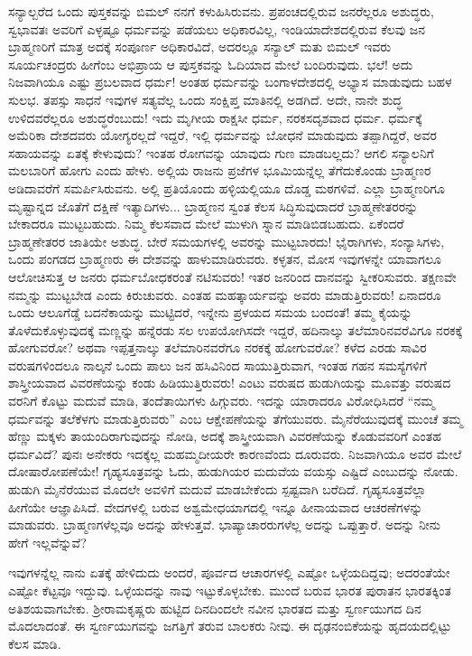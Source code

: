 ಸನ್ಯಾಲ್\enginline{-}ಬರೆದ ಒಂದು ಪುಸ್ತಕವನ್ನು ಬಿಮಲ್ ನನಗೆ ಕಳುಹಿಸಿರುವನು. ಪ್ರಪಂಚದಲ್ಲಿರುವ ಜನರೆಲ್ಲರೂ ಅಶುದ್ಧರು, ಸ್ವಭಾವತಃ ಅವರಿಗೆ ಎಳ್ಳಷ್ಟೂ ಧರ್ಮವನ್ನು ಪಡೆಯಲು ಅಧಿಕಾರವಿಲ್ಲ, ಇಂಡಿಯಾದೇಶದಲ್ಲಿರುವ ಕೆಲವು ಜನ ಬ್ರಾಹ್ಮಣರಿಗೆ ಮಾತ್ರ ಅದಕ್ಕೆ ಸಂಪೂರ್ಣ ಅಧಿಕಾರವಿದೆ, ಅದರಲ್ಲೂ ಸನ್ಯಾಲ್ ಮತು ಬಿಮಲ್ ಇವರು ಸೂರ್ಯಚಂದ್ರರು\enginline{-} ಹೀಗೆಂಬ ಅಭಿಪ್ರಾಯ ಆ ಪುಸ್ತಕವನ್ನು ಓದಿಯಾದ ಮೇಲೆ ಬಂದಿರುವುದು. ಭಲೆ! ಅದು ನಿಜವಾಗಿಯೂ ಎಷ್ಟು ಪ್ರಬಲವಾದ ಧರ್ಮ! ಅಂತಹ ಧರ್ಮವನ್ನು ಬಂಗಾಳದೇಶದಲ್ಲಿ ಅಭ್ಯಾಸ ಮಾಡುವುದು ಬಹಳ ಸುಲಭ. ತಪಸ್ಸು ಸಾಧನೆ ಇವುಗಳ ಸತ್ಯವೆಲ್ಲ ಒಂದು ಸಂಕ್ಷಿಪ್ತ ಮಾತಿನಲ್ಲಿ ಅಡಗಿದೆ. ಅದೇ, ನಾನೇ ಶುದ್ಧ ಉಳಿದವರೆಲ್ಲರೂ ಅಶುದ್ಧರೆಂಬುದು! ಇದು ಮೃಗೀಯ ರಾಕ್ಷಸೀ ಧರ್ಮ, ನರಕಸದೃಶವಾದ ಧರ್ಮ. ಧರ್ಮಕ್ಕೆ ಅಮೆರಿಕಾ ದೇಶದವರು ಯೋಗ್ಯರಲ್ಲದೆ ಇದ್ದರೆ, ಇಲ್ಲಿ ಧರ್ಮವನ್ನು ಬೋಧನೆ ಮಾಡುವುದು ತಪ್ಪಾಗಿದ್ದರೆ, ಅವರ ಸಹಾಯವನ್ನು ಏತಕ್ಕೆ ಕೇಳುವುದು? ಇಂತಹ ರೋಗವನ್ನು ಯಾವುದು ಗುಣ ಮಾಡಬಲ್ಲದು? ಆಗಲಿ ಸನ್ಯಾಲನಿಗೆ ಮಲಬಾರಿಗೆ ಹೋಗು ಎಂದು ಹೇಳು. ಅಲ್ಲಿಯ ರಾಜನು ಪ್ರಜೆಗಳ ಭೂಮಿಯನ್ನೆಲ್ಲ ತೆಗೆದುಕೊಂಡು ಬ್ರಾಹ್ಮಣರ ಅಡಿದಾವರೆಗೆ ಸಮರ್ಪಿಸಿರುವನು. ಅಲ್ಲಿ ಪ್ರತಿಯೊಂದು ಹಳ್ಳಿಯಲ್ಲಿಯೂ ದೊಡ್ಡ ಮಠಗಳಿವೆ. ಎಲ್ಲಾ ಬ್ರಾಹ್ಮಣರಿಗೂ ಮೃಷ್ಟಾನ್ನದ ಜೊತೆಗೆ ದಕ್ಷಿಣೆ ಇತ್ಯಾದಿಗಳು... ಬ್ರಾಹ್ಮಣನ ಸ್ವಂತ ಕೆಲಸ ಸಿದ್ಧಿಸುವುದಾದರೆ ಬ್ರಾಹ್ಮಣೇತರರನ್ನು ಬೇಕಾದರೂ ಮುಟ್ಟಬಹುದು. ನಿಮ್ಮ ಕೆಲಸವಾದ ಮೇಲೆ ಮುಳುಗಿ ಸ್ನಾನ ಮಾಡಿಬಿಡಬಹುದು. ಏಕೆಂದರೆ ಬ್ರಾಹ್ಮಣೇತರರ ಜಾತಿಯೇ ಅಶುದ್ಧ. ಬೇರೆ ಸಮಯಗಳಲ್ಲಿ ಅವರನ್ನು ಮುಟ್ಟಬಾರದು! ಭೈರಾಗಿಗಳು, ಸಂನ್ಯಾಸಿಗಳು, ಒಂದು ಪಂಗಡದ ಬ್ರಾಹ್ಮಣರು ಈ ದೇಶವನ್ನು ಹಾಳುಮಾಡಿರುವರು. ಕಳ್ಳತನ, ಮೋಸ ಇವುಗಳನ್ನೇ ಯಾವಾಗಲೂ ಆಲೋಚಿಸುತ್ತ ಆ ಜನರು ಧರ್ಮಬೋಧಕರಂತೆ ನಟಿಸುವರು! ಇತರ ಜನರಿಂದ ದಾನವನ್ನು ಸ್ವೀಕರಿಸುವರು. ತಕ್ಷಣವೇ ನಮ್ಮನ್ನು ಮುಟ್ಟಬೇಡ ಎಂದು ಕಿರುಚುವರು. ಎಂತಹ ಮಹತ್ಕಾರ್ಯವನ್ನು ಅವರು ಮಾಡುತ್ತಿರುವರು!\enginline{-} ಏನಾದರೂ ಒಂದು ಆಲೂಗೆಡ್ಡೆ ಬದನೆಕಾಯನ್ನು ಮುಟ್ಟಿದರೆ, ಇನ್ನೇನು ಪ್ರಳಯದ ಸಮಯ ಬಂದಂತೆ! ತಮ್ಮ ಕೈಯನ್ನು ತೊಳೆದುಕೊಳ್ಳುವುದಕ್ಕೆ ಮಣ್ಣನ್ನು ಹನ್ನೆರಡು ಸಲ ಉಪಯೋಗಿಸದೇ ಇದ್ದರೆ, ಹದಿನಾಲ್ಕು ತಲೆಮಾರಿನವರೆವಿಗೂ ನರಕಕ್ಕೆ ಹೋಗುವರೋ? ಅಥವಾ ಇಪ್ಪತ್ತನಾಲ್ಕು ತಲೆಮಾರಿನವರೆಗೂ ನರಕಕ್ಕೆ ಹೋಗುವರೋ? ಕಳೆದ ಎರಡು ಸಾವಿರ ವರುಷಗಳಿಂದಲೂ ನಾಲ್ಕನೆ ಒಂದು ಪಾಲು ಜನ ಹಸಿವಿನಿಂದ ಸಾಯುತ್ತಿರುವಾಗ, ಇಂತಹ ಗಹನ ಸಮಸ್ಯೆಗಳಿಗೆ ಶಾಸ್ತ್ರೀಯವಾದ ವಿವರಣೆಯನ್ನು ಕಂಡು ಹಿಡಿಯುತ್ತಿರುವರು! ಎಂಟು ವರುಷದ ಹುಡುಗಿಯನ್ನು ಮೂವತ್ತು ವರುಷದ ವರನಿಗೆ ಕೊಟ್ಟು ಮದುವೆ ಮಾಡಿ, ತಂದೆತಾಯಿಗಳು ಹಿಗ್ಗುವರು. ಇದನ್ನು ಯಾರಾದರೂ ವಿರೋಧಿಸಿದರೆ “ನಮ್ಮ ಧರ್ಮವನ್ನು ತಲೆಕೆಳಗು ಮಾಡುತ್ತಿರುವರು” ಎಂಬ ಆಕ್ಷೇಪಣೆಯನ್ನು ತೆಗೆಯುವರು. ಮೈನೆರೆಯುವುದಕ್ಕೆ ಮುಂಚೆ ತಮ್ಮ ಹೆಣ್ಣು ಮಕ್ಕಳು ತಾಯಂದಿರಾಗುವುದನ್ನು ನೋಡಿ, ಅದಕ್ಕೆ ಶಾಸ್ತ್ರೀಯವಾಗಿ ವಿವರಣೆಯನ್ನು ಕೊಡುವವರಿಗೆ ಎಂತಹ ಧರ್ಮವಿದೆ? ಪುನಃ ಅನೇಕರು ಇದಕ್ಕೆಲ್ಲ ಮಹಮ್ಮದೀಯರೇ ಕಾರಣವೆಂದು ದೂರುವರು. ನಿಜವಾಗಿಯೂ ಅವರ ಮೇಲೆ ದೋಷಾರೋಪಣೆಯೇ! ಗೃಹ್ಯಸೂತ್ರವನ್ನು ಓದು, ಹುಡುಗಿಯರ ಮದುವೆಯ ವಯಸ್ಸು ಎಷ್ಟಿದೆ ಎಂಬುದನ್ನು ನೋಡು. ಹುಡುಗಿ ಮೈನೆರೆಯುವ ಮೊದಲೇ ಅವಳಿಗೆ ಮದುವೆ ಮಾಡಬೇಕೆಂದು ಸ್ಪಷ್ಟವಾಗಿ ಬರೆದಿದೆ. ಗೃಹ್ಯಸೂತ್ರವೆಲ್ಲಾ ಹೀಗೆಯೇ ಆಜ್ಞಾಪಿಸಿದೆ. ವೇದಗಳಲ್ಲಿ ಬರುವ ಅಶ್ವಮೇಧಯಾಗದಲ್ಲಿ ಇನ್ನೂ ಹೀನಾಯವಾದ ಆಚರಣೆಗಳನ್ನು ಮಾಡುವರು. ಬ್ರಾಹ್ಮಣಗಳೆಲ್ಲವೂ ಅದನ್ನು ಹೇಳುತ್ತವೆ. ಭಾಷ್ಯಾಚಾರರುಗಳೆಲ್ಲ ಅದನ್ನು ಒಪ್ಪುತ್ತಾರೆ. ಅದನ್ನು ನೀನು ಹೇಗೆ ಇಲ್ಲವೆನ್ನುವೆ?

ಇವುಗಳನ್ನೆಲ್ಲ ನಾನು ಏತಕ್ಕೆ ಹೇಳಿದುದು ಅಂದರೆ, ಪೂರ್ವದ ಆಚಾರಗಳಲ್ಲಿ ಎಷ್ಟೋ ಒಳ್ಳೆಯದಿದ್ದವು; ಅದರಂತೆಯೇ ಎಷ್ಟೋ ಕೆಟ್ಟವೂ ಇದ್ದುವು. ಒಳ್ಳೆಯದನ್ನು ನಾವು ಇಟ್ಟುಕೊಳ್ಳಬೇಕು. ಮುಂದೆ ಬರುವ ಭಾರತ ಪುರಾತನ ಭಾರತಕ್ಕಿಂತ ಅತಿಶಯವಾಗಬೇಕು. ಶ‍್ರೀರಾಮಕೃಷ್ಣರು ಹುಟ್ಟಿದ ದಿನದಿಂದಲೇ ನವೀನ ಭಾರತದ ಮತ್ತು ಸ್ವರ್ಣಯುಗದ ದಿನ ಮೊದಲಾದಂತೆ. ಈ ಸ್ವರ್ಣಯುಗವನ್ನು ಜಗತ್ತಿಗೆ ತರುವ ಬಾಲಕರು ನೀವು. ಈ ದೃಢನಂಬಿಕೆಯನ್ನು ಹೃದಯದಲ್ಲಿಟ್ಟು ಕೆಲಸ ಮಾಡಿ.

